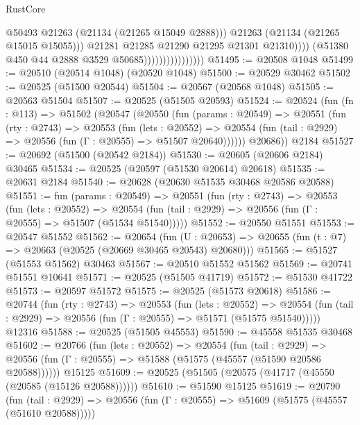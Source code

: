 \begin{lexlean}{RustCore}
\begin{coremodule}
                                              @50493
                                              @21263
                                              (@21134 (@21265 @15049 @2888)))
                                            @21263
                                            (@21134 (@21265 @15015 @15055)))
                                          @21281
                                          @21285
                                          @21290
                                          @21295
                                          @21301
                                          @21310))))
                                  (@51380 @450 @44 @2888 @3529 @50685))))))))))))))))
@51495 := @20508 @1048
@51499 := @20510 (@20514 @1048) (@20520 @1048)
@51500 := @20529 @30462
@51502 := @20525 (@51500 @20544)
@51504 := @20567 (@20568 @1048)
@51505 := @20563 @51504
@51507 := @20525 (@51505 @20593)
@51524 := @20524
    (fun (fn : @113) =>
    @51502
      (@20547
        (@20550
          (fun (params : @20549) =>
          @20551
            (fun (rty : @2743) =>
            @20553
              (fun (lets : @20552) =>
              @20554 (fun (tail : @2929) => @20556 (fun (Γ : @20555) => @51507 @20640))))))
        @20686))
    @2184
@51527 := @20692 (@51500 (@20542 @2184))
@51530 := @20605 (@20606 @2184) @30465
@51534 := @20525 (@20597 (@51530 @20614) @20618)
@51535 := @20631 @2184
@51540 := @20628 (@20630 @51535 @30468 @20586 @20588)
@51551 := fun (params : @20549) =>
  @20551
    (fun (rty : @2743) =>
    @20553
      (fun (lets : @20552) =>
      @20554 (fun (tail : @2929) => @20556 (fun (Γ : @20555) => @51507 (@51534 @51540)))))
@51552 := @20550 @51551
@51553 := @20547 @51552
@51562 := @20654
    (fun (U : @20653) => @20655 (fun (t : @7) => @20663 (@20525 (@20669 @30465 @20543) @20680)))
@51565 := @51527 (@51553 @51562) @30463
@51567 := @20510 @51552 @51562
@51569 := @20741 @51551 @10641
@51571 := @20525 (@51505 @41719)
@51572 := @51530 @41722
@51573 := @20597 @51572
@51575 := @20525 (@51573 @20618)
@51586 := @20744
    (fun (rty : @2743) =>
    @20553
      (fun (lets : @20552) =>
      @20554 (fun (tail : @2929) => @20556 (fun (Γ : @20555) => @51571 (@51575 @51540)))))
    @12316
@51588 := @20525 (@51505 @45553)
@51590 := @45558 @51535 @30468
@51602 := @20766
    (fun (lets : @20552) =>
    @20554
      (fun (tail : @2929) =>
      @20556 (fun (Γ : @20555) => @51588 (@51575 (@45557 (@51590 @20586 @20588))))))
    @15125
@51609 := @20525 (@51505 (@20575 (@41717 (@45550 (@20585 (@15126 @20588))))))
@51610 := @51590 @15125
@51619 := @20790
    (fun (tail : @2929) => @20556 (fun (Γ : @20555) => @51609 (@51575 (@45557 (@51610 @20588)))))

\end{coremodule}
\end{lexlean}
